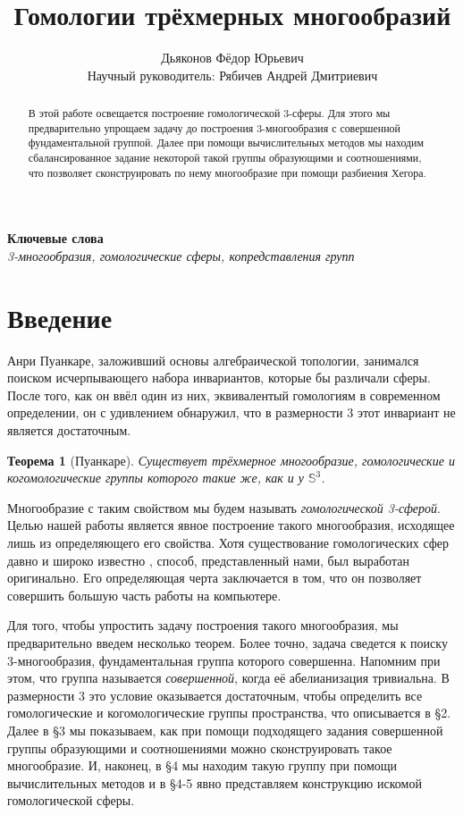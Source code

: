 \documentclass[a4paper, 12pt]{article}
\author{\large Дьяконов Фёдор Юрьевич \\ [1cm]{\small Научный руководитель: Рябичев Андрей Дмитриевич}}
\title{
Гомологии трёхмерных многообразий
}
\date{}
\newtheorem*{theorem}{Теорема}
\theoremstyle{definition}
\def\keywords#1{\begin{center}{\bf Ключевые слова}\\\textit{#1}\end{center}} %
\begin{document}
\maketitle

\keywords{3-многообразия, гомологические сферы, копредставления групп}

\begin{abstract}
    В этой работе освещается построение гомологической 3-сферы. Для этого мы предварительно упрощаем задачу до построения 3-многообразия с совершенной фундаментальной группой. Далее при помощи вычислительных методов мы находим сбалансированное задание некоторой такой группы образующими и соотношениями, что позволяет сконструировать по нему многообразие при помощи разбиения Хегора.
\end{abstract}


\section{Введение}
    Анри Пуанкаре, заложивший основы алгебраической топологии, занимался поиском исчерпывающего набора инвариантов, которые бы различали сферы. После того, как он ввёл один из них, эквивалентый гомологиям в современном определении, он с удивлением обнаружил, что в размерности 3 этот инвариант не является достаточным.

    \begin{theorem}[Пуанкаре]
        Существует трёхмерное многообразие, гомологические и когомологические группы которого такие же, как и у $\mathbb{S}^3$.
    \end{theorem}

    Многообразие с таким свойством мы будем называть \textit{гомологической 3-сферой}. Целью нашей работы является явное построение такого многообразия, исходящее лишь из определяющего его свойства. Хотя существование гомологических сфер давно и широко известно \cite[Глава 6, \S18]{1997-hj}, способ, представленный нами, был выработан оригинально. Его определяющая черта заключается в том, что он позволяет совершить большую часть работы на компьютере.

    Для того, чтобы упростить задачу построения такого многообразия, мы предварительно введем несколько теорем. Более точно, задача сведется к поиску 3-многообразия, фундаментальная группа которого совершенна. Напомним при этом, что группа называется \textit{совершенной}, когда её абелианизация тривиальна. В размерности 3 это условие оказывается достаточным, чтобы определить все гомологические и когомологические группы пространства, что описывается в \S2. Далее в \S3 мы показываем, как при помощи подходящего задания совершенной группы образующими и соотношениями можно сконструировать такое многообразие. И, наконец, в \S4 мы находим такую группу при помощи вычислительных методов и в \S4-5 явно представляем конструкцию искомой гомологической сферы.
\end{document}
